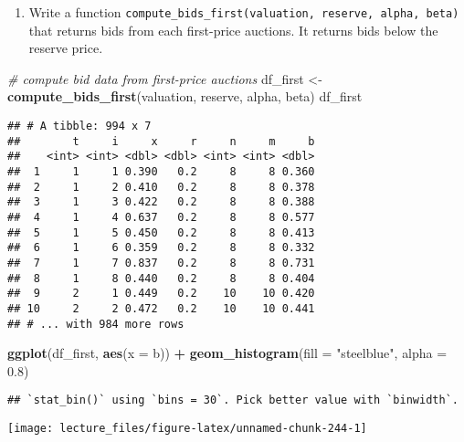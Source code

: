 \documentclass[
]{book}
\newenvironment{Shaded}{\begin{snugshade}}{\end{snugshade}}
\newcommand{\CommentTok}[1]{\textcolor[rgb]{0.56,0.35,0.01}{\textit{#1}}}
\newcommand{\DataTypeTok}[1]{\textcolor[rgb]{0.13,0.29,0.53}{#1}}
\newcommand{\FloatTok}[1]{\textcolor[rgb]{0.00,0.00,0.81}{#1}}
\newcommand{\KeywordTok}[1]{\textcolor[rgb]{0.13,0.29,0.53}{\textbf{#1}}}
\newcommand{\NormalTok}[1]{#1}
\newcommand{\OperatorTok}[1]{\textcolor[rgb]{0.81,0.36,0.00}{\textbf{#1}}}
\newcommand{\StringTok}[1]{\textcolor[rgb]{0.31,0.60,0.02}{#1}}
\providecommand{\tightlist}{%
  \setlength{\itemsep}{0pt}\setlength{\parskip}{0pt}}
\begin{document}
\begin{enumerate}
\def\labelenumi{\arabic{enumi}.}
\setcounter{enumi}{4}
\tightlist
\item
  Write a function \texttt{compute\_bids\_first(valuation,\ reserve,\ alpha,\ beta)} that returns bids from each first-price auctions. It returns bids below the reserve price.
\end{enumerate}

\begin{Shaded}
\begin{Highlighting}[]
\CommentTok{# compute bid data from first-price auctions}
\NormalTok{df_first <-}\StringTok{ }\KeywordTok{compute_bids_first}\NormalTok{(valuation, reserve, alpha, beta)}
\NormalTok{df_first}
\end{Highlighting}
\end{Shaded}

\begin{verbatim}
## # A tibble: 994 x 7
##        t     i     x     r     n     m     b
##    <int> <int> <dbl> <dbl> <int> <int> <dbl>
##  1     1     1 0.390   0.2     8     8 0.360
##  2     1     2 0.410   0.2     8     8 0.378
##  3     1     3 0.422   0.2     8     8 0.388
##  4     1     4 0.637   0.2     8     8 0.577
##  5     1     5 0.450   0.2     8     8 0.413
##  6     1     6 0.359   0.2     8     8 0.332
##  7     1     7 0.837   0.2     8     8 0.731
##  8     1     8 0.440   0.2     8     8 0.404
##  9     2     1 0.449   0.2    10    10 0.420
## 10     2     2 0.472   0.2    10    10 0.441
## # ... with 984 more rows
\end{verbatim}

\begin{Shaded}
\begin{Highlighting}[]
\KeywordTok{ggplot}\NormalTok{(df_first, }\KeywordTok{aes}\NormalTok{(}\DataTypeTok{x =}\NormalTok{ b)) }\OperatorTok{+}\StringTok{ }\KeywordTok{geom_histogram}\NormalTok{(}\DataTypeTok{fill =} \StringTok{"steelblue"}\NormalTok{, }\DataTypeTok{alpha =} \FloatTok{0.8}\NormalTok{)}
\end{Highlighting}
\end{Shaded}

\begin{verbatim}
## `stat_bin()` using `bins = 30`. Pick better value with `binwidth`.
\end{verbatim}

\begin{center}\texttt{[image: lecture\_files/figure-latex/unnamed-chunk-244-1]} \end{center}
\end{document}
